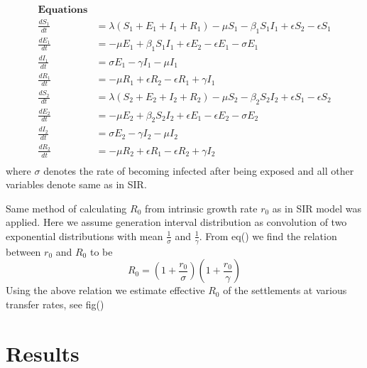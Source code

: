 \documentclass{article}
\begin{document}
\begin{equation}
  \begin{aligned}
\textbf{Equations} \\
\frac{dS_{1}}{dt} &=\lambda(S_{1}+E_{1}+I_{1}+R_{1}) -\mu  S_{1} - \beta_{1} S_{1}I_{1}  + \epsilon S_{2} -\epsilon S_{1} \\
\frac{dE_{1}}{dt} &= -\mu  E_{1} + \beta_{1} S_{1}I_{1}  + \epsilon E_{2} -\epsilon E_{1} -\sigma  E_{1} \\
\frac{dI_{1}}{dt} &= \sigma E_{1} -\gamma I_{1} -\mu I_{1} \\
\frac{dR_{1}}{dt} &= -\mu  R_{1} +  \epsilon R_{2} -\epsilon R_{1} +\gamma I_{1} \\
\frac{dS_{2}}{dt} &=\lambda(S_{2}+E_{2}+I_{2}+R_{2}) -\mu  S_{2} - \beta_{2} S_{2}I_{2}  + \epsilon S_{1} -\epsilon S_{2} \\
\frac{dE_{2}}{dt} &= -\mu  E_{2} + \beta_{2} S_{2}I_{2}  + \epsilon E_{1} -\epsilon E_{2} -\sigma  E_{2} \\
\frac{dI_{2}}{dt} &= \sigma E_{2} -\gamma I_{2} -\mu I_{2} \\
\frac{dR_{2}}{dt} &= -\mu  R_{2} +  \epsilon R_{1} -\epsilon R_{2} +\gamma I_{2} \\
  \end{aligned}
\end{equation}
where $\sigma$ denotes the rate of becoming infected after being exposed and all other variables denote same as in SIR.

Same method of calculating $R_{0}$ from intrinsic growth rate $r_{0}$
as in SIR model was applied. Here we assume generation interval
distribution as convolution of two exponential distributions with mean  
$\frac{1}{\sigma}$ and $\frac{1}{\gamma}$. From eq() we find the relation                                           %
between $r_{0}$ and $R_{0}$ to be
\begin{equation}
  R_{0}=(1+\frac{r_{0}}{\sigma})(1+\frac{r_{0}}{\gamma})
\end{equation}
Using the above relation we estimate effective $R_{0}$ of the
settlements at various transfer rates, see fig()                                                                             %

\section*{Results}
\end{document}
